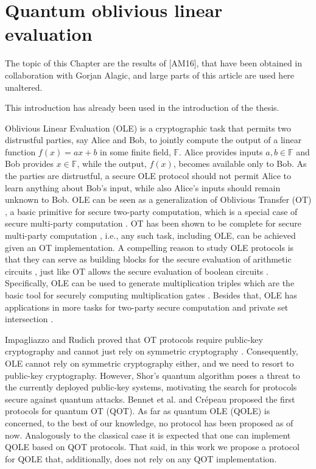 


%

\chapter{Quantum oblivious linear evaluation}

{\cv The topic of this Chapter are the results of [AM16], that have been obtained in collaboration with Gorjan Alagic, and large parts of this article are used here unaltered.}

{\cv This introduction has already been used in the introduction of the thesis.}

Oblivious Linear Evaluation (OLE) is a cryptographic task that permits two distrustful parties, say Alice and Bob, to jointly compute the output of a linear function $f(x)=ax+b$ in some finite field, $\mathbb{F}$. Alice provides inputs $a, b\in\mathbb{F}$ and Bob provides $x\in\mathbb{F}$, while the output, $f(x)$, becomes available only to Bob. As the parties are distrustful, a secure OLE protocol should not permit Alice to learn anything about Bob's input, while also Alice's inputs should remain unknown to Bob.  OLE can be seen as a generalization of Oblivious Transfer (OT) \cite{Rabin81}, a basic primitive for secure two-party computation, which is a special case of secure multi-party computation \cite{Goldreichbook04,CCD88,Canetti00MPC}. OT has been shown to be complete  for secure multi-party computation \cite{Kilian}, i.e., any such task, including OLE, can be achieved given an OT implementation. 
A compelling reason to study OLE protocols is that they can serve as building blocks for the secure evaluation of arithmetic circuits \cite{AIK11,DKMQ12,GNN17,DGNBNT17}, just like OT allows the secure evaluation of boolean circuits \cite{GMW87}. Specifically, OLE can be used to generate multiplication triples which are the basic tool for securely computing multiplication gates \cite{DGNBNT17}. Besides that, OLE has applications in more tasks for two-party secure computation  \cite{IPS09,ADINZ17,BCGI18,HIMV19,CDIKLOV19} and private set intersection \cite{GN19}.
 
Impagliazzo and Rudich proved that OT protocols require public-key cryptography and cannot just rely on symmetric cryptography \cite{IR89}. Consequently, OLE cannot rely on symmetric cryptography either, and we need to resort to public-key cryptography.  However, Shor's  quantum algorithm \cite{Shor94}  poses a threat to the currently deployed public-key systems, motivating the search for protocols secure against quantum attacks. Bennet et al. \cite{BBCS92} and Cr{\'e}peau \cite{C94} proposed the first protocols for quantum OT (QOT). As far as quantum OLE (QOLE) is concerned, to the best of our knowledge, no protocol has been proposed as of now.
Analogously to the classical case it is expected that one can implement QOLE based on QOT protocols. That said, in this work we propose a protocol for QOLE that, additionally, does not rely on any QOT implementation.

